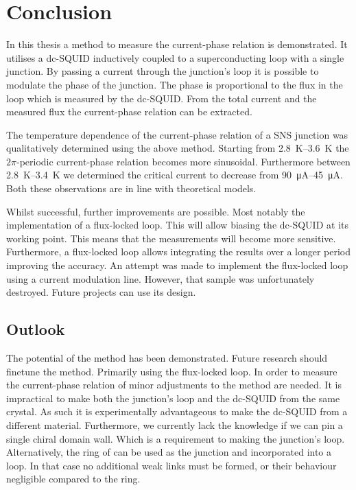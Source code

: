 \chapter{Conclusion}
In this thesis a method to measure the current-phase relation is demonstrated. It utilises a dc-SQUID inductively coupled to a superconducting loop with a single junction. By passing a current through the junction's loop it is possible to modulate the phase of the junction. The phase is proportional to the flux in the loop which is measured by the dc-SQUID. From the total current and the measured flux the current-phase relation can be extracted.

The temperature dependence of the current-phase relation of a SNS junction was qualitatively determined using the above method. Starting from \qtyrange{2.8}{3.6}{\kelvin} the $2\pi$-periodic current-phase relation becomes more sinusoidal. Furthermore between \qtyrange{2.8}{3.4}{\kelvin} we determined the critical current to decrease from \qtyrange{90}{45}{\micro\ampere}. Both these observations are in line with theoretical models.

Whilst successful, further improvements are possible. Most notably the implementation of a flux-locked loop. This will allow biasing the dc-SQUID at its working point. This means that the measurements will become more sensitive. Furthermore, a flux-locked loop allows integrating the results over a longer period improving the accuracy. An attempt was made to implement the flux-locked loop using a current modulation line. However, that sample was unfortunately destroyed. Future projects can use its design.

\section{Outlook}
The potential of the method has been demonstrated. Future research should finetune the method. Primarily using the flux-locked loop. In order to measure the current-phase relation of  minor adjustments to the method are needed. It is impractical to make both the junction's loop and the dc-SQUID from the same crystal. As such it is experimentally advantageous to make the dc-SQUID from a different material. Furthermore, we currently lack the knowledge if we can pin a single chiral domain wall. Which is a requirement to making the junction's loop. Alternatively, the ring of  can be used as the junction and incorporated into a loop. In that case no additional weak links must be formed, or their behaviour negligible compared to the  ring.